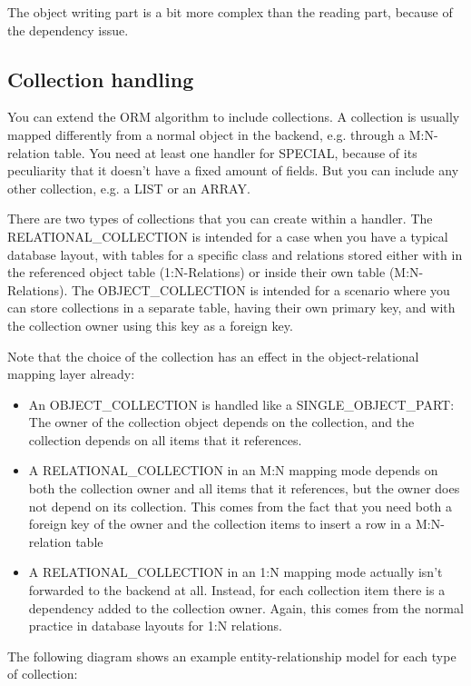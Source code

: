 The object writing part is a bit more complex than the reading part, because of the dependency issue.



\subsection{Collection handling}

You can extend the ORM algorithm to include collections. A collection is usually mapped differently from a normal object in the backend, e.g. through a M:N-relation table.
You need at least one handler for SPECIAL, because of its peculiarity that it doesn't have a fixed amount of fields.
But you can include any other collection, e.g. a LIST or an ARRAY.

There are two types of collections that you can create within a handler. 
The RELATIONAL\_COLLECTION is intended for a case when you have a typical database layout, with tables for a specific class and relations stored either with in the referenced object table (1:N-Relations) or inside their own table (M:N-Relations).
The OBJECT\_COLLECTION is intended for a scenario where you can store collections in a separate table, having their own primary key, and with the collection owner using this key as a foreign key.

Note that the choice of the collection has an effect in the object-relational mapping layer already:
\begin{itemize}
 \item An OBJECT\_COLLECTION is handled like a SINGLE\_OBJECT\_PART: The owner of the collection object depends on the collection, and the collection depends on all items that it references.
 \item A RELATIONAL\_COLLECTION in an M:N mapping mode depends on both the collection owner and all items that it references, but the owner does not depend on its collection.
 This comes from the fact that you need both a foreign key of the owner and the collection items to insert a row in a M:N-relation table
 \item A RELATIONAL\_COLLECTION in an 1:N mapping mode actually isn't forwarded to the backend at all. Instead, for each collection item there is a dependency added to the collection owner.
 Again, this comes from the normal practice in database layouts for 1:N relations.
\end{itemize}

The following diagram shows an example entity-relationship model for each type of collection:


